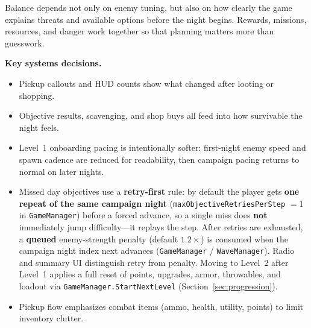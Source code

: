 \documentclass[11pt]{article}
\begin{document}
Balance depends not only on enemy tuning, but also on how clearly the game explains threats and available options before the night begins. Rewards, missions, resources, and danger work together so that planning matters more than guesswork.

\noindent\textbf{Key systems decisions.}
\begin{itemize}
    \item Pickup callouts and HUD counts show what changed after looting or shopping.
    \item Objective results, scavenging, and shop buys all feed into how survivable the night feels.
    \item Level~1 onboarding pacing is intentionally softer: first-night enemy speed and spawn cadence are reduced for readability, then campaign pacing returns to normal on later nights.
    \item Missed day objectives use a \textbf{retry-first} rule: by default the player gets \textbf{one repeat of the same campaign night} (\texttt{maxObjectiveRetriesPerStep} $= 1$ in \texttt{GameManager}) before a forced advance, so a single miss does \textbf{not} immediately jump difficulty---it replays the step. After retries are exhausted, a \textbf{queued} enemy-strength penalty (default $1.2\times$) is consumed when the campaign night index next advances (\texttt{GameManager} / \texttt{WaveManager}). Radio and summary UI distinguish retry from penalty. Moving to Level~2 after Level~1 applies a full reset of points, upgrades, armor, throwables, and loadout via \texttt{GameManager.StartNextLevel} (Section~\ref{sec:progression}).
    \item Pickup flow emphasizes combat items (ammo, health, utility, points) to limit inventory clutter.
\end{itemize}
\end{document}

